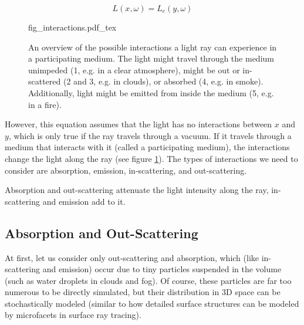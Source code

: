 \begin{equation}\label{eq:no_attenuation}
L({x},\omega ) = L_e({y}, \omega )
\end{equation}

\begin{figure}
\centering
\def\svgwidth{\columnwidth}
{fig_interactions.pdf_tex}

\caption{An overview of the possible interactions a light ray can experience in a participating medium. The light might travel through the medium unimpeded (1, e.g. in a clear atmosphere), might be out or in-scattered (2 and 3, e.g. in clouds), or absorbed (4, e.g. in smoke). Additionally, light might be emitted from inside the medium (5, e.g. in a fire).}
\label{fig:light_interactions}
\end{figure}


However, this equation assumes that the light has no interactions between ${x}$ and ${y}$, which is only true if the ray travels through a vacuum. If it travels through a medium that interacts with it (called a participating medium), the interactions change the light along the ray\cite{10.5555/275458.275468} (see figure \ref{fig:light_interactions}). The types of interactions we need to consider are absorption, emission, in-scattering, and out-scattering\cite{468400}.

Absorption and out-scattering attenuate the light intensity along the ray, in-scattering and emission add to it.
\subsection{Absorption and Out-Scattering}
At first, let us consider only out-scattering and absorption, which (like in-scattering and emission) occur due to tiny particles suspended in the volume\cite{10.1145/1179352.1141986} (such as water droplets in clouds and fog).
Of course, these particles are far too numerous to be directly simulated, but their distribution in 3D space can be stochastically modeled\cite{10.1145/1179352.1141986} (similar to how detailed surface structures can be modeled by microfacets \cite{10.1145/965141.563893} in surface ray tracing).

